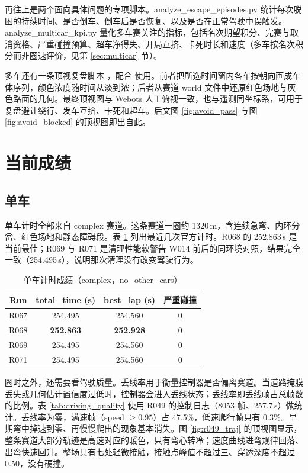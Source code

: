 \documentclass[UTF8,a4paper]{ctexart}
\begin{document}
再往上是两个面向具体问题的专项脚本。analyze\_escape\_episodes.py 统计每次脱困的持续时间、是否倒车、倒车后是否恢复、以及是否在正常驾驶中误触发。analyze\_multicar\_kpi.py 量化多车赛关注的指标，包括名次期望积分、完赛与取消资格、严重碰撞预算、超车净得失、开局互挤、卡死时长和速度（多车按名次积分而非圈速评价，见第 \ref{sec:multicar} 节）。

多车还有一条顶视复盘脚本 ，配合  使用。前者把所选时间窗内各车按朝向画成车体序列，颜色浓度随时间从淡到浓；后者从赛道 world 文件中还原红色场地与灰色路面的几何。最终顶视图与 Webots 人工俯视一致，也与遥测同坐标系，可用于复盘避让绕行、发车互挤、卡死和超车。后文图 \ref{fig:avoid_pass} 与图 \ref{fig:avoid_blocked} 的顶视图即出自此。

\section{当前成绩}
\subsection{单车}

单车计时全部来自 complex 赛道。这条赛道一圈约 1320\,m，含连续急弯、内环分岔、红色场地和静态障碍段。表 \ref{tab:single_time} 列出最近几次官方计时。R068 的 252.863\,s 是当前最佳；R069 与 R071 是清理性能软警告 W014 前后的同环境对照，结果完全一致（254.495\,s），说明那次清理没有改变驾驶行为。

\begin{table}[!htbp]
	\centering
	\caption{单车计时成绩（complex，no\_other\_cars）}
	\label{tab:single_time}
	\small
	\begin{tabular}{@{}cccc@{}}
		\toprule
		Run & total\_time (s) & best\_lap (s) & 严重碰撞 \\
		\midrule
		R067 & 254.495 & 254.560 & 0 \\
		R068 & \textbf{252.863} & \textbf{252.928} & 0 \\
		R069 & 254.495 & 254.560 & 0 \\
		R071 & 254.495 & 254.560 & 0 \\
		\bottomrule
	\end{tabular}
\end{table}

圈时之外，还需要看驾驶质量。丢线率用于衡量控制器是否偏离赛道。当道路掩膜丢失或几何估计置信度过低时，控制器会进入丢线状态；丢线率即丢线帧占总帧数的比例。表 \ref{tab:driving_quality} 使用 R049 的控制日志（8053 帧、257.7\,s）做统计。丢线率为零，满速帧（speed $\geq 0.95$）占 47.5\%，低速爬行帧只有 0.3\%。早期弯中掉速到零、再慢慢爬出的现象基本消失。图 \ref{fig:r049_traj} 的顶视图显示，整条赛道大部分轨迹是高速对应的暖色，只有弯心转冷；速度曲线进弯规律回落、出弯快速回升。整场只有七处轻微接触，接触点峰值不超过三、穿透深度不超过 0.50，没有硬撞。
\end{document}
